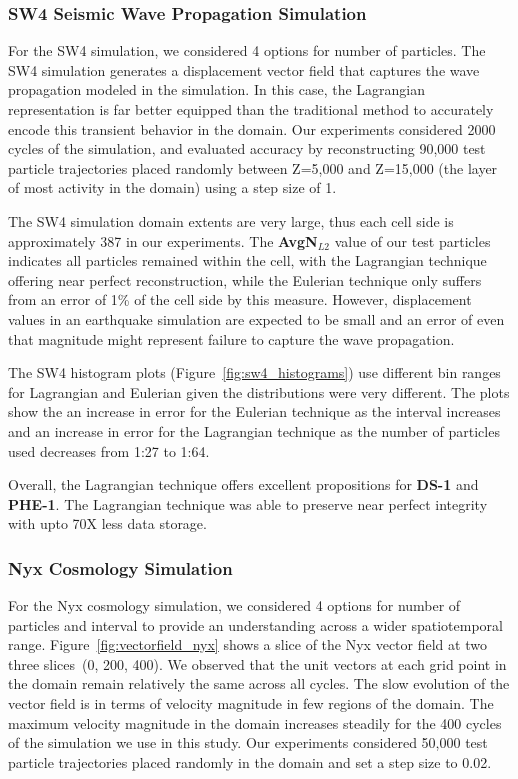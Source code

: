 \subsubsection{SW4 Seismic Wave Propagation Simulation}
For the SW4 simulation, we considered 4 options for number of particles.
%
%
The SW4 simulation generates a displacement vector field that captures the wave propagation modeled in the simulation. 
%
In this case, the Lagrangian representation is far better equipped than the traditional method to accurately encode this transient behavior in the domain. 
%
Our experiments considered 2000 cycles of the simulation, and evaluated accuracy by reconstructing 90,000 test particle trajectories placed randomly between Z=5,000 and Z=15,000 (the layer of most activity in the domain) using a step size of 1.

The SW4 simulation domain extents are very large, thus each cell side is approximately 387 in our experiments.
%
The \textbf{AvgN$_{L2}$} value of our test particles indicates all particles remained within the cell, with the Lagrangian technique offering near perfect reconstruction, while the Eulerian technique only suffers from an error of 1\% of the cell side by this measure.
%
However, displacement values in an earthquake simulation are expected to be small and an error of even that magnitude might represent failure to capture the wave propagation.
%

The SW4 histogram plots (Figure~\ref{fig:sw4_histograms}) use different bin ranges for Lagrangian and Eulerian given the distributions were very different.
%
The plots show the an increase in error for the Eulerian technique as the interval increases and an increase in error for the Lagrangian technique as the number of particles used decreases from 1:27 to 1:64.
%

Overall, the Lagrangian technique offers excellent propositions for \textbf{DS-1} and \textbf{PHE-1}.
%
The Lagrangian technique was able to preserve near perfect integrity with upto 70X less data storage.
\subsubsection{Nyx Cosmology Simulation}
For the Nyx cosmology simulation, we considered 4 options for number of particles and interval to provide an understanding across a wider spatiotemporal range.
%
Figure~\ref{fig:vectorfield_nyx} shows a slice of the Nyx vector field at two three slices~(0, 200, 400).
%
We observed that the unit vectors at each grid point in the domain remain relatively the same across all cycles.
%
The slow evolution of the vector field is in terms of velocity magnitude in few regions of the domain.
%
The maximum velocity magnitude in the domain increases steadily for the 400 cycles of the simulation we use in this study.
%
Our experiments considered 50,000 test particle trajectories placed randomly in the domain and set a step size to 0.02.


